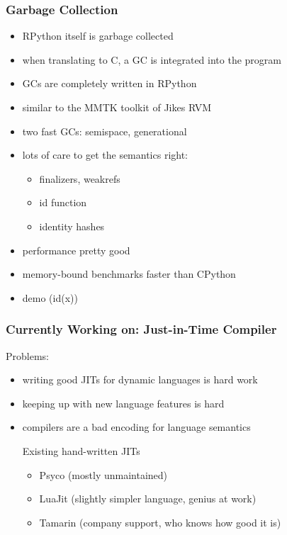 \documentclass[utf8x]{beamer}
\begin{document}
\begin{frame}
  \frametitle{Garbage Collection}
  \begin{itemize}
  \item RPython itself is garbage collected
  \item when translating to C, a GC is integrated into the program
  \item GCs are completely written in RPython
  \item similar to the MMTK toolkit of Jikes RVM
  \item two fast GCs: semispace, generational
  \item lots of care to get the semantics right:
    \begin{itemize}
    \item finalizers, weakrefs
    \item id function
    \item identity hashes
    \end{itemize}
  \item performance pretty good
  \item memory-bound benchmarks faster than CPython
  \item demo (id(x))
  \end{itemize}
\end{frame}


\begin{frame}
  \frametitle{Currently Working on: Just-in-Time Compiler}
  Problems:
  \begin{itemize}
  \item writing good JITs for dynamic languages is hard work
  \item keeping up with new language features is hard
  \item compilers are a bad encoding for language semantics
  \pause
  \begin{block}{
    Existing hand-written JITs}
    \begin{itemize}
    \item Psyco (mostly unmaintained)
    \item LuaJit (slightly simpler language, genius at work)
    \item Tamarin (company support, who knows how good it is)
    \end{itemize}
  \end{block}
  \end{itemize}
  \pause
\end{frame}
\end{document}
